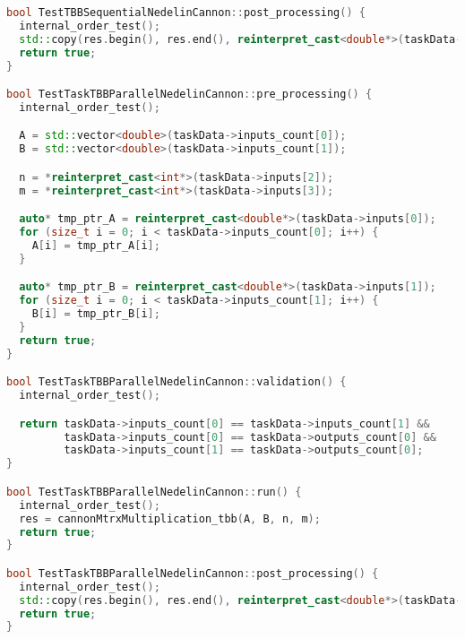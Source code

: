 \documentclass{report}
\begin{document}
\begin{lstlisting}[language=C++,caption=TBB версия]
bool TestTBBSequentialNedelinCannon::post_processing() {
  internal_order_test();
  std::copy(res.begin(), res.end(), reinterpret_cast<double*>(taskData->outputs[0]));
  return true;
}

bool TestTaskTBBParallelNedelinCannon::pre_processing() {
  internal_order_test();

  A = std::vector<double>(taskData->inputs_count[0]);
  B = std::vector<double>(taskData->inputs_count[1]);

  n = *reinterpret_cast<int*>(taskData->inputs[2]);
  m = *reinterpret_cast<int*>(taskData->inputs[3]);

  auto* tmp_ptr_A = reinterpret_cast<double*>(taskData->inputs[0]);
  for (size_t i = 0; i < taskData->inputs_count[0]; i++) {
    A[i] = tmp_ptr_A[i];
  }

  auto* tmp_ptr_B = reinterpret_cast<double*>(taskData->inputs[1]);
  for (size_t i = 0; i < taskData->inputs_count[1]; i++) {
    B[i] = tmp_ptr_B[i];
  }
  return true;
}

bool TestTaskTBBParallelNedelinCannon::validation() {
  internal_order_test();

  return taskData->inputs_count[0] == taskData->inputs_count[1] &&
         taskData->inputs_count[0] == taskData->outputs_count[0] &&
         taskData->inputs_count[1] == taskData->outputs_count[0];
}

bool TestTaskTBBParallelNedelinCannon::run() {
  internal_order_test();
  res = cannonMtrxMultiplication_tbb(A, B, n, m);
  return true;
}

bool TestTaskTBBParallelNedelinCannon::post_processing() {
  internal_order_test();
  std::copy(res.begin(), res.end(), reinterpret_cast<double*>(taskData->outputs[0]));
  return true;
}
\end{lstlisting}

\newpage
\end{document}
